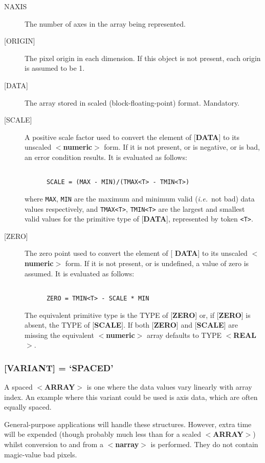 \documentclass[twoside,11pt]{article}
\renewcommand{\_}{\texttt{\symbol{95}}}
\begin{document}
\begin{description}
\item [NAXIS]
The number of axes in the array being represented.
\item [{[}ORIGIN{]}]
The pixel origin in each dimension.  If this object is not present,
each origin is assumed to be 1.
\item [{[}DATA{]}]
The array stored in scaled (block-floating-point) format. Mandatory.
\item [{[}SCALE{]}]
A positive scale factor used to convert the element of
{[}{\bf DATA}{]} to its
unscaled $<${\bf numeric}$>$ form.  If it is not present,
or is negative, or is bad, an error condition results.
It is evaluated as follows:
\begin{verbatim}

      SCALE = (MAX - MIN)/(TMAX<T> - TMIN<T>)

\end{verbatim}
where {\tt MAX}, {\tt MIN} are the maximum and minimum valid ({\it i.e.}\  not bad)
data values respectively, and {\tt TMAX<T>}, {\tt TMIN<T>}  are
the largest and smallest valid values for the primitive type of {[}{\bf DATA}{]}, represented
by token {\tt <T>}.
\item [{[}ZERO{]}]
The zero point used to convert the element of {[}{\bf
DATA}{]} to its unscaled $<${\bf numeric}$>$ form.  If it is not
present,
or is undefined, a value of zero is assumed.  It is evaluated as follows:
\begin{verbatim}

      ZERO = TMIN<T> - SCALE * MIN

\end{verbatim}

The equivalent primitive type is the TYPE of {[}{\bf ZERO}{]} or, if
{[}{\bf ZERO}{]} is absent, the TYPE of {[}{\bf SCALE}{]}.  If both
{[}{\bf ZERO}{]} and {[}{\bf SCALE}{]} are missing the equivalent
$<${\bf numeric}$>$ array defaults to TYPE $<${\bf \_REAL}$>$.
\end{description}

\subsubsection{{[}{\bf VARIANT}{]} = `SPACED'}
A spaced \mbox{$<${\bf ARRAY}$>$} is one where the data values
vary linearly with array index.
An example where this variant could be used is axis data, which are
often equally spaced.

General-purpose applications will handle these structures.  However,
extra time will be expended (though probably much less than for a
scaled \mbox{$<${\bf ARRAY}$>$}) whilst conversion to
and from a $<${\bf narray}$>$ is performed.
They do not contain magic-value bad pixels.
\end{document}
